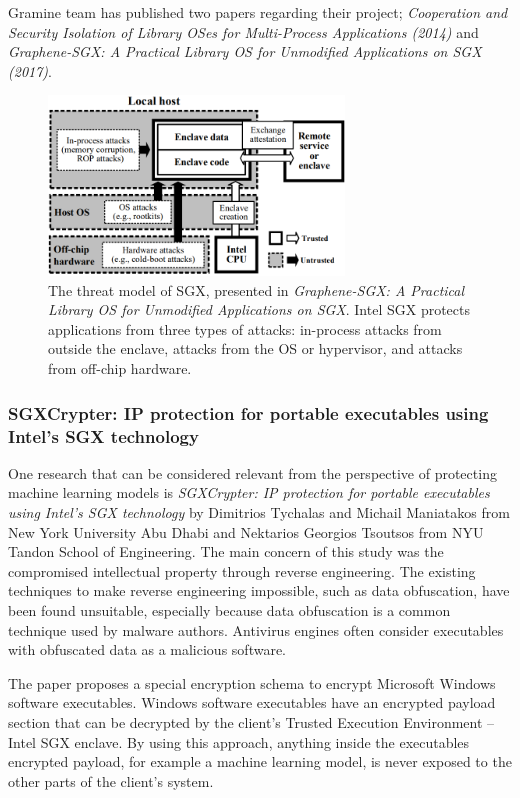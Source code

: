 Gramine team has published two papers regarding their project; \textit{Cooperation and Security Isolation of Library OSes for Multi-Process Applications (2014)}\cite{graminepaper} and \textit{Graphene-SGX: A Practical Library {OS} for Unmodified Applications on SGX (2017)}\cite{graminesgxwp}.

\begin{figure}
\centering \includegraphics[width=0.7\textwidth]{img/graminethreat}
\caption{The threat model of SGX, presented in \textit{Graphene-SGX: A Practical Library {OS} for Unmodified Applications on SGX}. Intel SGX protects applications from three types of attacks: in-process attacks from outside the enclave, attacks from the OS or hypervisor, and attacks from off-chip hardware.}
\label{img:threatmodel} 
\end{figure}

\subsubsection{SGXCrypter: IP protection for portable executables using Intel's SGX technology} \label{sgxcrypter}

One research that can be considered relevant from the perspective of protecting machine learning models is \textit{SGXCrypter: IP protection for portable executables using Intel's SGX technology} by Dimitrios Tychalas and Michail Maniatakos from New York University Abu Dhabi and Nektarios Georgios Tsoutsos from NYU Tandon School of Engineering. The main concern of this study was the compromised intellectual property through reverse engineering. The existing techniques to make reverse engineering impossible, such as data obfuscation, have been found unsuitable, especially because data obfuscation is a common technique used by malware authors. Antivirus engines often consider executables with obfuscated data as a malicious software.

The paper proposes a special encryption schema to encrypt Microsoft Windows software executables. Windows software executables have an encrypted payload section that can be decrypted by the client's Trusted Execution Environment -- Intel SGX enclave. By using this approach, anything inside the executables encrypted payload, for example a machine learning model, is never exposed to the other parts of the client's system.